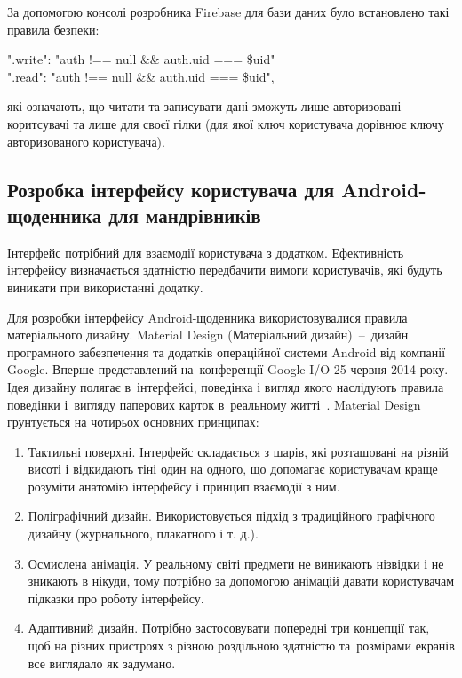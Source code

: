 \documentclass[../main.tex]{subfiles}
\begin{document}
За допомогою консолі розробника Firebase для бази даних було встановлено такі правила безпеки:
\begin{center}
	".write": "auth !== null \&\& auth.uid === \$uid"\\
	".read": "auth !== null \&\& auth.uid === \$uid",
\end{center}
які означають, що читати та записувати дані зможуть лише авторизовані коритсувачі та лише для своєї гілки (для якої ключ користувача дорівнює ключу авторизованого користувача).

\subsection{Розробка інтерфейсу користувача для Android-щоденника для мандрівників}
Інтерфейс потрібний для взаємодії користувача з додатком. Ефективність інтерфейсу визначається здатністю передбачити вимоги користувачів, які будуть виникати при використанні додатку. 

Для розробки інтерфейсу Android-щоденника використовувалися правила матеріального дизайну. Material Design (Матеріальний дизайн)~--~дизайн програмного забезпечення та додатків операційної системи Android від компанії Google. Вперше представлений на~конференції Google I/O 25 червня 2014 року.  Ідея дизайну полягає в~інтерфейсі, поведінка і вигляд якого наслідують правила поведінки і~вигляду паперових карток в~реальному житті~\cite{materail_design}. Material Design грунтується на чотирьох основних принципах:

\begin{enumerate}
	\item Тактильні поверхні. Інтерфейс складається з шарів, які розташовані на різній висоті і відкидають тіні один на одного, що допомагає користувачам краще розуміти анатомію інтерфейсу і принцип взаємодії з ним.
	\item Поліграфічний дизайн. Використовується підхід з традиційного графічного дизайну (журнального, плакатного і т. д.).
	\item Осмислена анімація. У реальному світі предмети не виникають нізвідки і не зникають в нікуди, тому потрібно за допомогою анімацій давати користувачам підказки про роботу інтерфейсу.
	\item Адаптивний дизайн. Потрібно застосовувати попередні три концепції так, щоб на різних пристроях з різною роздільною здатністю та~розмірами екранів все виглядало як задумано.
\end{enumerate}
\end{document}
